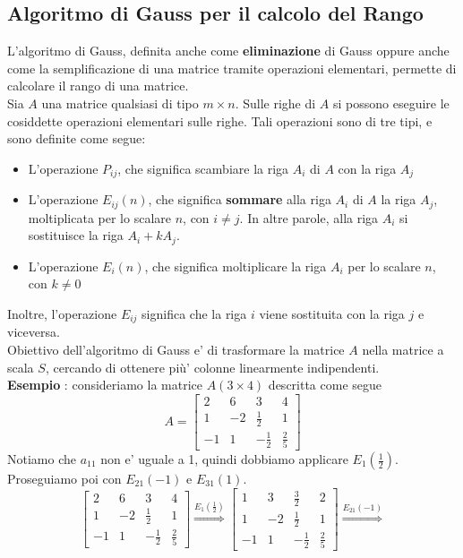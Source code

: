\documentclass[a4paper, 10pt]{article}
\begin{document}
	\subsection{Algoritmo di Gauss per il calcolo del Rango}
	L'algoritmo di Gauss, definita anche come \textbf{eliminazione} di Gauss oppure anche come la
	semplificazione di una matrice tramite operazioni elementari, permette di calcolare il rango di una matrice.\\
	Sia $A$ una matrice qualsiasi di tipo $m \times n$. Sulle righe di $A$ si possono eseguire le cosiddette 
	operazioni elementari sulle righe. Tali operazioni sono di tre tipi, e sono definite come segue:
	\begin{itemize}
		\item L'operazione $P_{ij}$, che significa scambiare la riga $A_{i}$ di $A$ con la riga $A_{j}$
		\item L'operazione $E_{ij}(n)$, che significa \textbf{sommare} alla riga $A_{i}$ di $A$ la riga $A_{j}$, 
			  moltiplicata per lo scalare $n$, con $i \neq j$. In altre parole, alla riga $A_{i}$ si 
			  sostituisce la riga $A_{i} + kA_{j}$.
		\item L'operazione $E_{i}(n)$, che significa moltiplicare la riga $A_{i}$ per lo scalare $n$, con $k \neq 0$
	\end{itemize}
	Inoltre, l'operazione $E_{ij}$ significa che la riga $i$ viene sostituita con la riga $j$ e viceversa.\\
	Obiettivo dell'algoritmo di Gauss e' di trasformare la matrice $A$ nella matrice a scala $S$,
	cercando di ottenere più' colonne linearmente indipendenti. \\
	\textbf{Esempio} : consideriamo la matrice $A (3 \times 4)$ descritta come segue
	\[
	A=
		\begin{bmatrix}
			2 & 6 & 3 & 4 \\
			1 & -2 & \frac{1}{2} & 1 \\
			-1 & 1 & -\frac{1}{2} &  \frac{2}{5}
		\end{bmatrix}
	\]
	Notiamo che $a_{11}$ non e' uguale a 1, quindi dobbiamo applicare $E_{1}(\frac{1}{2})$. \\
	Proseguiamo poi con $E_{21}(-1)$ e $E_{31}(1)$.
	\[
		\begin{bmatrix}
			2 & 6 & 3 & 4 \\
			1 & -2 & \frac{1}{2} & 1 \\
			-1 & 1 & -\frac{1}{2} &  \frac{2}{5}
		\end{bmatrix}
		\stackrel{E_{1}(\frac{1}{2})}{\Longrightarrow}		
		\begin{bmatrix}
			1 & 3 & \frac{3}{2} & 2 \\
			1 & -2 & \frac{1}{2} & 1 \\
			-1 & 1 & -\frac{1}{2} &  \frac{2}{5}
		\end{bmatrix}
		\stackrel{E_{21}(-1)}{\Longrightarrow}
	\]	
\end{document}
